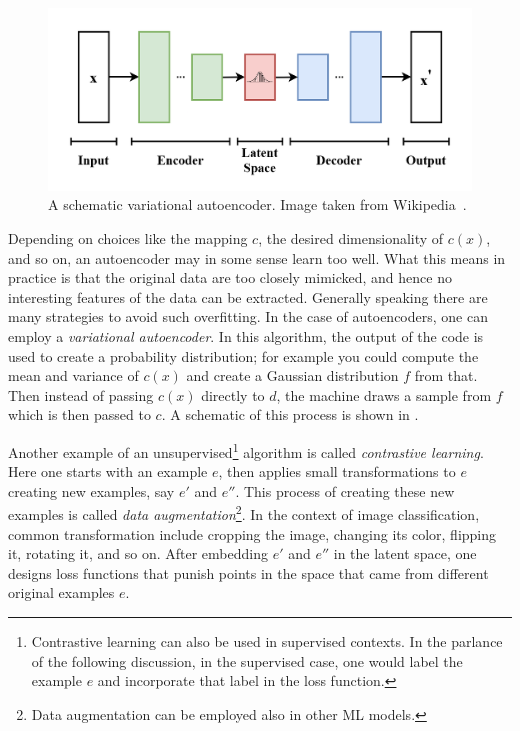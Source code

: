 \begin{figure}
\includegraphics[width=\linewidth]{figs/VAE.png}
\caption{A schematic variational autoencoder.
Image taken from Wikipedia~\cite{wikiVAE}.}
\label{fig:VAE}
\end{figure}

Depending on choices like the mapping $c$, the desired dimensionality of $c(x)$,
and so on, an autoencoder may in some sense learn too well. What this means in
practice is that the original data are too closely mimicked, and hence no
interesting features of the data can be extracted. Generally speaking there
are many strategies to avoid such overfitting. 
In the case of autoencoders,
one can employ a {\it variational autoencoder}.
In this algorithm, the output of the code is used to create a probability
distribution; for example you could compute the mean and variance of $c(x)$ and
create a Gaussian distribution $f$ from that. Then instead of passing $c(x)$
directly to $d$, the machine draws a sample from $f$ which is then passed to
$c$. A schematic of this process is shown in .

Another example of an unsupervised\footnote{Contrastive learning can also
be used in supervised contexts. In the parlance of the following discussion,
in the supervised case, one would label the example $e$ and incorporate
that label in the loss function.} algorithm is called {\it contrastive
learning}. Here one starts with an example $e$,
then applies small transformations to $e$ creating new examples, say $e'$ and
$e''$. This process of creating these new examples is called {\it data
augmentation}\footnote{Data augmentation can be
employed also in other ML models.}. 
In the context of image classification,
common transformation include cropping the image, changing its color, flipping
it, rotating it, and so on. 
After embedding $e'$ and $e''$ in the latent space, one designs loss functions
that punish points in the space that came from different original examples $e$.

